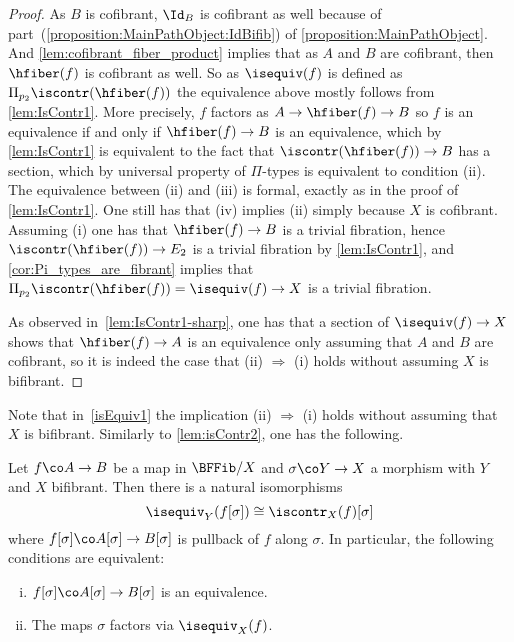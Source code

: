 \begin{proof} As $B$ is cofibrant, $\Id_{B}$ is cofibrant as well because of part~(\ref{proposition:MainPathObject:IdBifib}) of \cref{proposition:MainPathObject}. And \cref{lem:cofibrant_fiber_product} implies that as $A$ and $B$ are cofibrant, then $\hfiber(f)$ is cofibrant as well. So as $\isequiv(f)$ is defined as $\Pi_{p_2}\iscontr( \hfiber(f))$ the equivalence above mostly follows from \cref{lem:IsContr1}. More precisely, $f$ factors as $A \to \hfiber(f) \to B$ so $f$ is an equivalence if and only if $\hfiber(f) \to B$ is an equivalence, which by \cref{lem:IsContr1} is equivalent to the fact that $\iscontr( \hfiber(f)) \to B$ has a section, which by universal property of $\Pi$-types is equivalent to condition (ii). The equivalence between (ii) and (iii) is formal, exactly as in the proof of \cref{lem:IsContr1}. One still has that (iv) implies (ii) simply because $X$ is cofibrant. Assuming (i) one has that $\hfiber(f) \to B$ is a trivial fibration, hence $\iscontr( \hfiber(f)) \to E_2$ is a trivial fibration by \cref{lem:IsContr1}, and \cref{cor:Pi_types_are_fibrant} implies that $\Pi_{p_2} \iscontr( \hfiber(f)) = \isequiv(f) \to X$ is a trivial fibration.

As observed in~\cref{lem:IsContr1-sharp}, one has that a section of $\isequiv(f) \to X$ shows that $\hfiber(f) \to A$ is an equivalence only assuming that $A$ and $B$ are cofibrant, so it is indeed the case that (ii) $\Rightarrow$ (i) holds without assuming $X$ is bifibrant.
\end{proof}

Note that in~\cref{isEquiv1} the implication (ii) $\Rightarrow$ (i) holds without assuming that $X$ is bifibrant. Similarly to \cref{lem:isContr2}, one has the following.

\begin{lemma} \label{lem:isEquiv2}
Let $f \co A \rightarrow B$ be a map in $\BFFib/X$  and $\sigma \co Y \rightarrow X$ a morphism with $Y$ and $X$ bifibrant. Then there is a natural isomorphisms
\[ 
\isequiv_Y(f[\sigma]) \cong \iscontr_X(f) [\sigma]
\]
where $f[\sigma] \co A[\sigma] \rightarrow B[\sigma]$ is pullback of $f$ along $\sigma$. 
In particular, the following conditions are equivalent: 
\begin{enumerate}[(i)]
\item $f[\sigma] \co A[\sigma] \rightarrow B[\sigma]$ is an equivalence.
\item The maps $\sigma$ factors via $\isequiv_X(f)$.
\end{enumerate}
\end{lemma}





